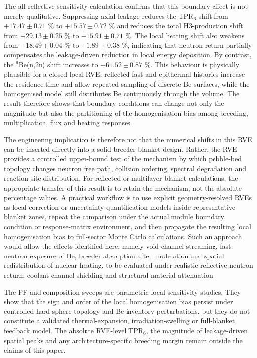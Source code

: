 \documentclass[preprint,12pt]{elsarticle}
\begin{document}
The all-reflective sensitivity calculation confirms that this boundary effect is
not merely qualitative.  Suppressing axial leakage reduces the TPR$_6$ shift from
$+17.47\pm0.71$ \% to $+15.57\pm0.72$ \% and reduces the total H3-production
shift from $+29.13\pm0.25$ \% to $+15.91\pm0.71$ \%.  The local heating shift
also weakens from $-18.49\pm0.04$ \% to $-1.89\pm0.38$ \%, indicating that
neutron return partially compensates the leakage-driven reduction in local
energy deposition.  By contrast, the $^9$Be(n,2n) shift increases to
$+61.52\pm0.87$ \%.  This behaviour is physically plausible for a closed local
RVE: reflected fast and epithermal histories increase the residence time and
allow repeated sampling of discrete Be surfaces, while the homogenised model
still distributes Be continuously through the volume.  The result therefore
shows that boundary conditions can change not only the magnitude but also the
partitioning of the homogenisation bias among breeding, multiplication, flux and
heating responses.

The engineering implication is therefore not that the numerical shifts in this
RVE can be inserted directly into a solid breeder blanket design.  Rather, the
RVE provides a controlled upper-bound test of the mechanism by which pebble-bed
topology changes neutron free path, collision ordering, spectral degradation and
reaction-site distribution.  For reflected or multilayer blanket calculations,
the appropriate transfer of this result is to retain the mechanism, not the
absolute percentage values.  A practical workflow is to use explicit
geometry-resolved RVEs as local correction or uncertainty-quantification models
inside representative blanket zones, repeat the comparison under the actual
module boundary condition or response-matrix environment, and then propagate the
resulting local homogenisation bias to full-sector Monte Carlo calculations.
Such an approach would allow the effects identified here, namely void-channel
streaming, fast-neutron exposure of Be, breeder absorption after moderation and
spatial redistribution of nuclear heating, to be evaluated under realistic
reflective neutron return, coolant-channel shielding and structural-material
attenuation.

The PF and composition sweeps are parametric local sensitivity studies.  They
show that the sign and order of the local homogenisation bias persist under
controlled hard-sphere topology and Be-inventory perturbations, but they do not
constitute a validated thermal-expansion, irradiation-swelling or full-blanket
feedback model.  The absolute RVE-level TPR$_6$, the magnitude of
leakage-driven spatial peaks and any architecture-specific breeding margin
remain outside the claims of this paper.
\end{document}
